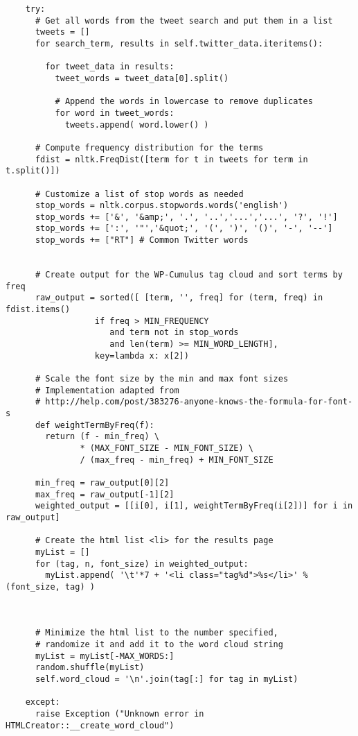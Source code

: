 \begin{verbatim}
    try:
      # Get all words from the tweet search and put them in a list
      tweets = []
      for search_term, results in self.twitter_data.iteritems():

        for tweet_data in results:
          tweet_words = tweet_data[0].split()

          # Append the words in lowercase to remove duplicates
          for word in tweet_words:
            tweets.append( word.lower() ) 

      # Compute frequency distribution for the terms
      fdist = nltk.FreqDist([term for t in tweets for term in t.split()])

      # Customize a list of stop words as needed
      stop_words = nltk.corpus.stopwords.words('english')
      stop_words += ['&', '&amp;', '.', '..','...','...', '?', '!']
      stop_words += [':', '"','&quot;', '(', ')', '()', '-', '--']
      stop_words += ["RT"] # Common Twitter words


      # Create output for the WP-Cumulus tag cloud and sort terms by freq
      raw_output = sorted([ [term, '', freq] for (term, freq) in fdist.items()
                  if freq > MIN_FREQUENCY 
                     and term not in stop_words 
                     and len(term) >= MIN_WORD_LENGTH], 
                  key=lambda x: x[2])

      # Scale the font size by the min and max font sizes
      # Implementation adapted from 
      # http://help.com/post/383276-anyone-knows-the-formula-for-font-s
      def weightTermByFreq(f):
        return (f - min_freq) \
               * (MAX_FONT_SIZE - MIN_FONT_SIZE) \
               / (max_freq - min_freq) + MIN_FONT_SIZE

      min_freq = raw_output[0][2]
      max_freq = raw_output[-1][2]
      weighted_output = [[i[0], i[1], weightTermByFreq(i[2])] for i in raw_output]

      # Create the html list <li> for the results page
      myList = []
      for (tag, n, font_size) in weighted_output:
        myList.append( '\t'*7 + '<li class="tag%d">%s</li>' % (font_size, tag) )



      # Minimize the html list to the number specified,
      # randomize it and add it to the word cloud string
      myList = myList[-MAX_WORDS:]
      random.shuffle(myList)
      self.word_cloud = '\n'.join(tag[:] for tag in myList)

    except:
      raise Exception ("Unknown error in HTMLCreator::__create_word_cloud")
\end{verbatim}
